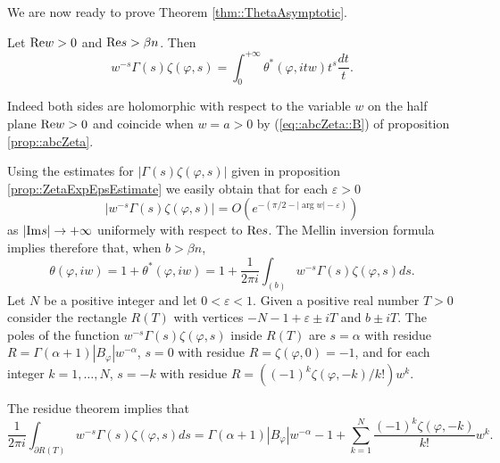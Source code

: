 \documentclass[12pt,a4paper]{amsart}
\begin{document}
{We are now ready to prove Theorem \ref{thm::ThetaAsymptotic}.

Let ${\mathop{\rm Re}\nolimits}{w}>0$ and
${\mathop{\rm Re}\nolimits}{s}>{\beta}{n}$.
Then
\begin{equation}\nonumber
	{w}^{-{s}}\Gamma({s}){\zeta}({\varphi},{s})=
	\int_0^{+\infty}\theta^*({\varphi},i{t}{w}){t}^{s}
		\frac{d{t}}{t}.
\end{equation}

Indeed both sides are holomorphic
with respect to the variable ${w}$
on the half plane ${\mathop{\rm Re}\nolimits}{w}>0$ 
and coincide when ${w}={a}>0$ 
by (\ref{eq::abcZeta::B}) of proposition \ref{prop::abcZeta}.

Using the estimates for
${\left|{\Gamma({s}){\zeta}({\varphi},{s})}\right|}$
given in proposition \ref{prop::ZetaExpEpsEstimate}
we easily obtain that for each ${\varepsilon}>0$
\begin{equation}\label{eq::proof::Grow}
	{\left|{{w}^{-{s}}\Gamma({s}){\zeta}({\varphi},{s})}\right|}
	=O(e^{-(\pi/2-{\left|{\arg{w}}\right|}-{\varepsilon})})
\end{equation}
as ${\left|{{\mathop{\rm Im}\nolimits}{s}}\right|}\to+\infty$ uniformely with respect to ${\mathop{\rm Re}\nolimits}{s}$.
The Mellin inversion formula implies
therefore that, when ${b}>{\beta}{n}$,
\begin{equation}\label{eq::proof::Mellin}
	\theta({\varphi},i{w})=
	1+\theta^*({\varphi},i{w})=
	1+\frac{1}{2\pi i}
	\int_{({b})}{w}^{-{s}}\Gamma({s})
		{\zeta}({\varphi},{s})d{s}.
\end{equation}
Let ${N}$ be a positive integer and let $0<{\varepsilon}<1$.
Given a positive real number ${T}>0$ consider the rectangle
${{{R}({T})}}$ with vertices
$-{N}-1+{\varepsilon}\pm i{T}$ and ${b}\pm i{T}$.
The poles of the function
${w}^{-{s}}\Gamma({s}){\zeta}({\varphi},{s})$
inside ${{{R}({T})}}$ are
${s}={\alpha}$ with residue
$
R=\Gamma({\alpha}+1){\left|{{B}_{\varphi}}\right|}{w}^{-{\alpha}}$,
${s}=0$ with residue
$R={\zeta}({\varphi},0)=-1$,
and for each integer ${k}=1,\ldots,{N}$,
${s}=-{k}$ with residue
$R=((-1)^{k}{\zeta}({\varphi},-{k})/{k}!){w}^{k}$.

The residue theorem implies that
\begin{equation}\nonumber
	\frac{1}{2\pi i}\int_{\partial{{{R}({T})}}}
		{w}^{-{s}}\Gamma({s})
		{\zeta}({\varphi},{s})d{s}
	=\Gamma({\alpha}+1){\left|{{B}_{\varphi}}\right|}{w}^{-{\alpha}}
	-1+
	\sum_{{k}=1}^{N}
		\frac{(-1)^{k}{\zeta}({\varphi},-{k})}{{k}!}{w}^{k}.
\end{equation}

}
\end{document}
